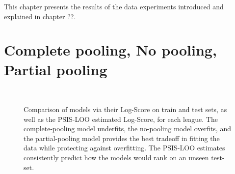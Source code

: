 This chapter presents the results of the data experiments introduced and explained in chapter ??.

\section{Complete pooling, No pooling, Partial pooling}

\begin{figure}
	 \\
	\caption{Comparison of models via their Log-Score on train and test sets, as well as the PSIS-LOO estimated Log-Score, for each league. The complete-pooling model underfits, the no-pooling model overfits, and the partial-pooling model provides the best tradeoff in fitting the data while protecting against overfitting. The PSIS-LOO estimates consistently predict how the models would rank on an unseen test-set.}
	\label{fig:log_scores}
\end{figure}

